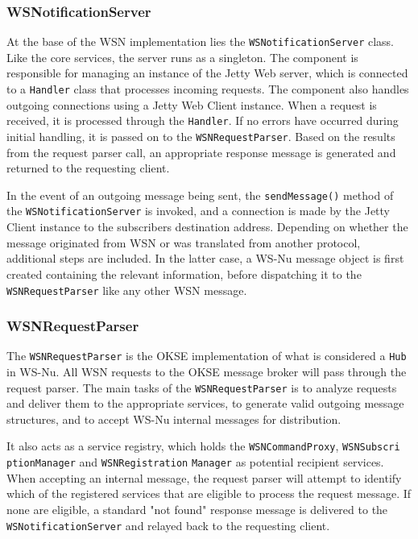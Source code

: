 \subsubsection{WSNotificationServer}
At the base of the WSN implementation lies the \verb!WSNotificationServer! class. Like the core services, the server runs as a singleton. The component is responsible for managing an instance of the Jetty Web server, which is connected to a \verb!Handler! class that processes incoming requests. The component also handles outgoing connections using a Jetty Web Client instance. When a request is received, it is processed through the \verb!Handler!. If no errors have occurred during initial handling, it is passed on to the \verb!WSNRequestParser!. Based on the results from the request parser call, an appropriate response message is generated and returned to the requesting client.

In the event of an outgoing message being sent, the \verb!sendMessage()! method of the \verb!WSNotification!\verb!Server! is invoked, and a connection is made by the Jetty Client instance to the subscribers destination address. Depending on whether the message originated from WSN or was translated from another protocol, additional steps are included. In the latter case, a WS-Nu message object is first created containing the relevant information, before dispatching it to the \verb!WSNRequest!\verb!Parser! like any other WSN message.

\subsubsection{WSNRequestParser}
The \verb!WSNRequestParser! is the OKSE implementation of what is considered a \verb!Hub! in WS-Nu. All WSN requests to the OKSE message broker will pass through the request parser. The main tasks of the \verb!WSNRequestParser! is to analyze requests and deliver them to the appropriate services, to generate valid outgoing message structures, and to accept WS-Nu internal messages for distribution. 

It also acts as a service registry, which holds the \verb!WSNCommandProxy!, \verb!WSNSubscri! \verb!ptionManager! and \verb!WSNRegistration! \verb!Manager! as potential recipient services. When accepting an internal message, the request parser will attempt to identify which of the registered services that are eligible to process the request message. If none are eligible, a standard "not found" response message is delivered to the \verb!WSNotification!\verb!Server! and relayed back to the requesting client.

